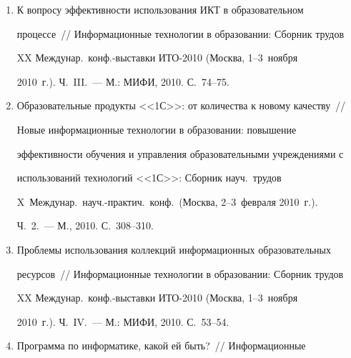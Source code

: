 \begin{enumerate}[1.]
Дистанционное повышение квалификации учителей~/\!\!/  Информационные 


технологии в образовании (ИТО-Москва-2010): Мат-лы Междунар.\ 


конф.\ (Москва, МИРЭА, 14--16~ноября 2010~г.). Ч.~2.~--- М.: МИРЭА, 2010. 


С.~196--197.


\item {}


К вопросу эффективности использования ИКТ в образовательном 


процессе~/\!\!/  Информационные технологии в образовании: Сборник трудов 


XX Междунар.\ конф.-выставки ИТО-2010 (Москва, 1--3~ноября 


2010~г.). Ч.~III.~--- М.: МИФИ, 2010. С.~74--75.


\item {}


Образовательные продукты <<1С>>: от количества к новому качеству~/\!\!/  


Новые информационные технологии  в образовании: повышение 


эффективности обучения и управления образовательными учреж\-де\-ни\-ями с 


использований технологий <<1С>>: Сборник науч.\ трудов 


X~Междунар.\ науч.-практич.\ конф.\ (Москва, 2--3~февраля 2010~г.). 


Ч.~2.~--- М., 2010. С.~308--310.


\item {}


Проблемы использования коллекций информационных образовательных 


ресурсов~/\!\!/  Информационные технологии в образовании: Сборник трудов 


XX Междунар.\ конф.-выставки ИТО-2010 (Москва, 1--3~ноября 


2010~г.). Ч.~IV.~--- М.: МИФИ, 2010. С.~53--54.













\item {}


Программа по информатике, какой ей быть?~/\!\!/  Информационные 



\end{enumerate}
